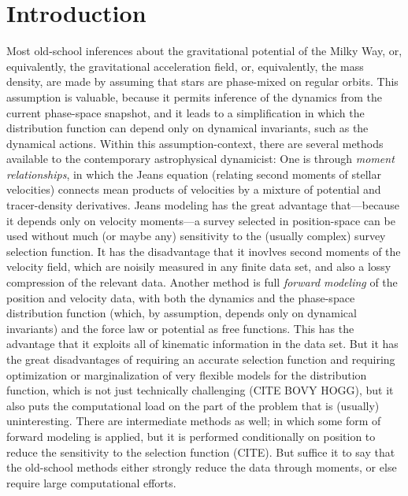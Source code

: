 \documentclass[modern]{aastex62}
\begin{document}

\section{Introduction}

Most old-school inferences about the gravitational potential of the
Milky Way, or, equivalently, the gravitational acceleration field, or,
equivalently, the mass density, are made by assuming that stars are
phase-mixed on regular orbits.
This assumption is valuable, because it permits inference of the
dynamics from the current phase-space snapshot, and it leads to a
simplification in which the distribution function can depend only on
dynamical invariants, such as the dynamical actions.
Within this assumption-context, there are several methods available to the
contemporary astrophysical dynamicist:
One is through \emph{moment relationships}, in which the Jeans equation (relating second moments
of stellar velocities) connects mean products of velocities by a mixture of potential and
tracer-density derivatives.
Jeans modeling has the great advantage that---because it depends only on velocity
moments---a survey selected in position-space can be used without much
(or maybe any) sensitivity to the (usually complex) survey selection
function.
It has the disadvantage that it inovlves second moments of the velocity
field, which are noisily measured in any finite data set, and also a lossy
compression of the relevant data.
Another method is full \emph{forward modeling} of the position and velocity
data, with both the dynamics and the phase-space distribution function
(which, by assumption, depends only on dynamical invariants) and the
force law or potential as free functions.
This has the advantage that it exploits all of kinematic information in
the data set.
But it has the great disadvantages of requiring an accurate selection function
and requiring optimization or marginalization of very flexible models for
the distribution function, which is not just technically challenging (CITE BOVY HOGG), but it
also puts the computational load on the part of the problem that is (usually)
uninteresting.
There are intermediate methods as well; in which some form of forward
modeling is applied, but it is performed conditionally on position to reduce
the sensitivity to the selection function (CITE).
But suffice it to say that the old-school methods either strongly reduce the
data through moments, or else require large computational efforts.
\end{document}
